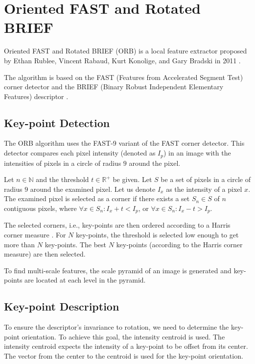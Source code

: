 \section{Oriented FAST and Rotated BRIEF}
Oriented FAST and Rotated BRIEF (ORB) is a local feature extractor proposed by Ethan Rublee, Vincent Rabaud, Kurt Konolige, and Gary Bradski in 2011 \cite{Rublee2011}.

The algorithm is based on the FAST (Features from Accelerated Segment Test) corner detector \cite{Rosten2006} and the BRIEF (Binary Robust Independent Elementary Features) descriptor \cite{Calonder2010}.

\subsection{Key-point Detection}
The ORB algorithm uses the FAST-9 variant of the FAST corner detector. This detector compares each pixel intensity (denoted as $I_p$) in an image with the intensities of pixels in a circle of radius $9$ around the pixel.

Let $n\in\mathbb{N}$ and the threshold $t\in\mathbb{R}^{+}$ be given. Let $S$ be a set of pixels in a circle of radius $9$ around the examined pixel. Let us denote $I_x$ as the intensity of a pixel $x$. The examined pixel is selected as a corner if there exists a set $S_n \in S$ of $n$ contiguous pixels, where $\forall x \in S_n: I_x + t < I_p$, or $\forall x \in S_n: I_x - t > I_p$.

The selected corners, i.e., key-points are then ordered according to a Harris corner measure \cite{Harris1988}. For $N$ key-points, the threshold is selected low enough to get more than $N$ key-points. The best $N$ key-points (according to the Harris corner measure) are then selected.

To find multi-scale features, the scale pyramid of an image is generated and key-points are located at each level in the pyramid.

\subsection{Key-point Description}
To ensure the descriptor's invariance to rotation, we need to determine the key-point orientation. To achieve this goal, the intensity centroid \cite{Rosin1999} is used. The intensity centroid expects the intensity of a key-point to be offset from its center. The vector from the center to the centroid is used for the key-point orientation.

